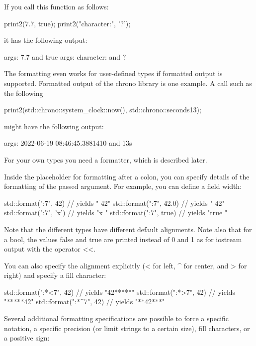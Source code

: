 If you call this function as follows:

\begin{cpp}
print2(7.7, true);
print2("character:", '?');
\end{cpp}

it has the following output:

\begin{shell}
args: 7.7 and true
args: character: and ?
\end{shell}

The formatting even works for user-defined types if formatted output is supported. Formatted output of the chrono library is one example. A call such as the following

\begin{cpp}
print2(std::chrono::system_clock::now(), std::chrono::seconds{13});
\end{cpp}

might have the following output:

\begin{shell}
args: 2022-06-19 08:46:45.3881410 and 13s
\end{shell}

For your own types you need a formatter, which is described later.

Inside the placeholder for formatting after a colon, you can specify details of the formatting of the passed argument. For example, you can define a field width:

\begin{cpp}
std::format("{:7}", 42) // yields " 42"
std::format("{:7}", 42.0) // yields " 42"
std::format("{:7}", 'x') // yields "x "
std::format("{:7}", true) // yields "true "
\end{cpp}

Note that the different types have different default alignments. Note also that for a bool, the values false and true are printed instead of 0 and 1 as for iostream output with the operator <{}<.

You can also specify the alignment explicitly (< for left, \^{} for center, and > for right) and specify a fill character:

\begin{cpp}
std::format("{:*<7}", 42) // yields "42*****"
std::format("{:*>7}", 42) // yields "*****42"
std::format("{:*^7}", 42) // yields "**42***"
\end{cpp}

Several additional formatting specifications are possible to force a specific notation, a specific precision (or limit strings to a certain size), fill characters, or a positive sign:

